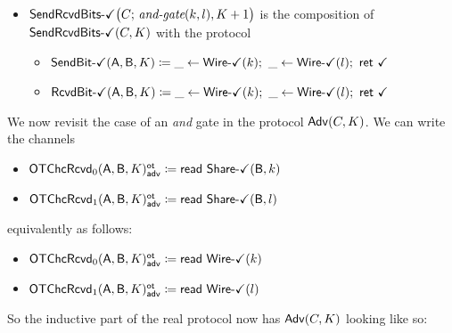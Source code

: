 \begin{itemize}
\item $\mathsf{SendRcvdBits}\textsf{-}\checkmark\big(C; \, \textit{and-gate}(k,l),K+1\big)$ is the composition of $\mathsf{SendRcvdBits}\textsf{-}\checkmark(C,K)$ with the protocol
\begin{itemize}
\item {\color{teal} $\SendBitOk(\A,\B,K) \coloneqq \_ \leftarrow \WireOk(k); \ \_ \leftarrow \WireOk(l); \ \ret{\checkmark}$}
\item {\color{teal} $\RcvdBitOk(\A,\B,K) \coloneqq \_ \leftarrow \WireOk(k); \ \_ \leftarrow \WireOk(l); \ \ret{\checkmark}$}
\end{itemize}
\end{itemize}

\noindent We now revisit the case of an \emph{and} gate in the protocol $\mathsf{Adv}(C,K)$. We can write the channels
\begin{itemize}
\item {\color{blue} $\mathsf{OTChcRcvd}_0(\mathsf{A},\mathsf{B},K)^{\mathsf{ot}}_{\mathsf{adv}} \coloneqq \mathsf{read} \ \mathsf{Share}\textsf{-}\checkmark(\mathsf{B},k)$}
\item {\color{blue} $\mathsf{OTChcRcvd}_1(\mathsf{A},\mathsf{B},K)^{\mathsf{ot}}_{\mathsf{adv}} \coloneqq \mathsf{read} \ \mathsf{Share}\textsf{-}\checkmark(\mathsf{B},l)$}
\end{itemize}
equivalently as follows:
\begin{itemize}
\item {\color{blue} $\mathsf{OTChcRcvd}_0(\mathsf{A},\mathsf{B},K)^{\mathsf{ot}}_{\mathsf{adv}} \coloneqq \mathsf{read} \ \mathsf{Wire}\textsf{-}\checkmark(k)$}
\item {\color{blue} $\mathsf{OTChcRcvd}_1(\mathsf{A},\mathsf{B},K)^{\mathsf{ot}}_{\mathsf{adv}} \coloneqq \mathsf{read} \ \mathsf{Wire}\textsf{-}\checkmark(l)$}
\end{itemize}
So the inductive part of the real protocol now has $\mathsf{Adv}(C,K)$ looking like so:

